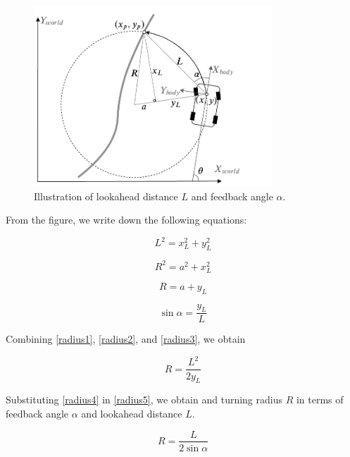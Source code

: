 \begin{figure}[h]
  \centering
  \includegraphics[width=0.8\textwidth]{figures/pure-pursuit-radius.pdf}
  \caption{Illustration of lookahead distance $L$ and feedback angle $\alpha$.}
  \label{figure:radius}
\end{figure}

From the figure, we write down the following equations:

\begin{equation}
    L^2 = x^2_L + y^2_L
\label{eq:radius1}
\end{equation}

\begin{equation}
    R^2 = a^2 + x^2_L
\label{eq:radius2}
\end{equation}

\begin{equation}
    R = a + y_L
\label{eq:radius3}
\end{equation}

\begin{equation}
    \sin{\alpha} = \frac{y_L}{L}
\label{eq:radius4}
\end{equation}

Combining \eqref{radius1}, \eqref{radius2}, and \eqref{radius3}, we obtain

\begin{equation}
    R = \frac{L^2}{2y_L}
\label{eq:radius5}
\end{equation}

Substituting \eqref{radius4} in \eqref{radius5}, we obtain and turning radius
$R$ in terms of feedback angle $\alpha$ and lookahead distance $L$.

\begin{equation}
    R = \frac{L}{2\sin{\alpha}}
\label{eq:radius6}
\end{equation}

